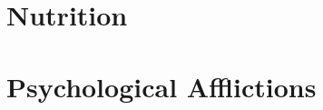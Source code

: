 \documentclass[makeidx]{book}
\begin{document}
\doparttoc
\frontmatter


%


\mainmatter
%


%


%

\part{Nutrition}
\parttoc


\part{Psychological Afflictions}
\parttoc


\label{part:medicine}



{}

\backmatter
\label{index}\printindex
\end{document}
